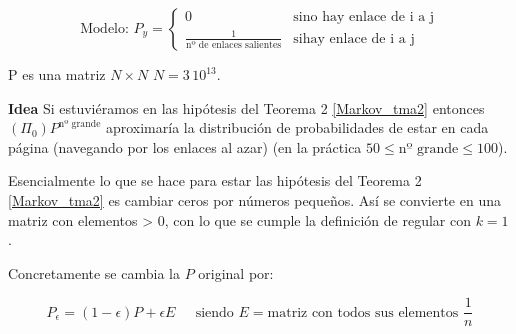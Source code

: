 \begin{center}
\end{center}


$$\text{Modelo: } P_y = \left\{
	\begin{array}{ll}
		0  & \mbox{si} \text{no hay enlace de i a j} \\
		\frac{1}{\text{nº de enlaces salientes}} & \mbox{si} \text{hay enlace de i a j}
	\end{array}
\right.
$$

P es una matriz $N \times N$ $N = 3 \, 10^{13}$.

\textbf{Idea} Si estuviéramos en las hipótesis del Teorema 2 \ref{Markov_tma2} entonces  $(\Pi_0) P^{\text{nº grande}}$ aproximaría la distribución de probabilidades de estar en cada página (navegando por los enlaces al azar) (en la práctica $50 \leq \text{nº grande} \leq 100$).


Esencialmente lo que se hace para estar las hipótesis del Teorema 2 \ref{Markov_tma2} es cambiar ceros por números pequeños. Así se convierte en una matriz con elementos > 0, con lo que se cumple la definición de regular con $k=1$.

Concretamente se cambia la $P$ original por:

$$P_{\epsilon} = (1-\epsilon) P + \epsilon E \;\;\;\; \text{ siendo }E = \text{matriz con todos sus elementos } \frac{1}{n}$$

